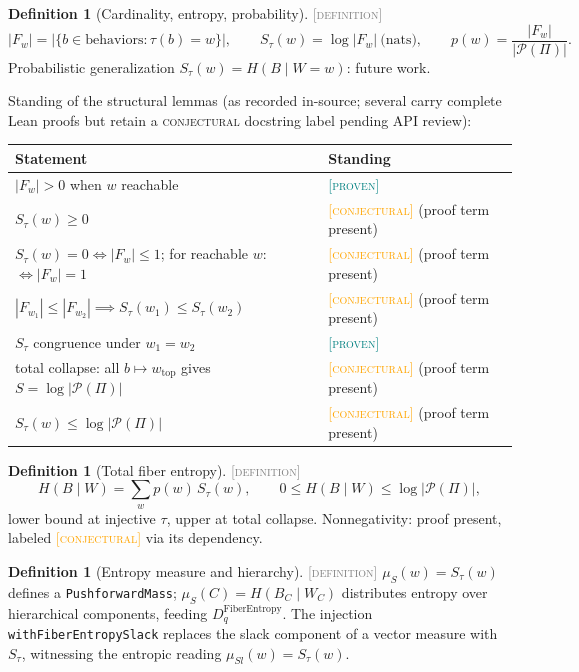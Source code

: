 \documentclass[11pt]{article}
\newcommand{\PROVEN}{\textcolor{teal}{\textsc{[proven]}}}
\newcommand{\DEFINITION}{\textcolor{gray}{\textsc{[definition]}}}
\newcommand{\CONJECTURAL}{\textcolor{orange}{\textsc{[conjectural]}}}
\newcommand{\PT}{\Pi}                          %
\newcommand{\PS}{\mathcal{P}(\PT)}             %
\newcommand{\tmap}{\tau}                       %
\newcommand{\fib}[1]{F_{#1}}                   %
\theoremstyle{plain}
\theoremstyle{definition}
\newtheorem{definition}[theorem]{Definition}
\begin{document}
\begin{definition}[Cardinality, entropy, probability]\DEFINITION\;
\[
  |\fib{w}| = |\{b \in \mathrm{behaviors} : \tmap(b) = w\}|,
  \qquad
  S_\tmap(w) = \log|\fib{w}| \ \text{(nats)},
  \qquad
  p(w) = \frac{|\fib{w}|}{|\PS|}.
\]
Probabilistic generalization $S_\tmap(w) = H(B \mid W = w)$: future work.
\end{definition}

Standing of the structural lemmas (as recorded in-source; several carry
complete Lean proofs but retain a \textsc{conjectural} docstring label
pending API review):
\begin{center}
\begin{tabular}{@{}ll@{}}
\toprule
Statement & Standing \\
\midrule
$|\fib{w}| > 0$ when $w$ reachable & \PROVEN \\
$S_\tmap(w) \ge 0$ & \CONJECTURAL{} (proof term present) \\
$S_\tmap(w) = 0 \iff |\fib{w}| \le 1$; for reachable $w$: $\iff |\fib{w}| = 1$ & \CONJECTURAL{} (proof term present) \\
$|\fib{w_1}| \le |\fib{w_2}| \implies S_\tmap(w_1) \le S_\tmap(w_2)$ & \CONJECTURAL{} (proof term present) \\
$S_\tmap$ congruence under $w_1 = w_2$ & \PROVEN \\
total collapse: all $b \mapsto w_{\mathrm{top}}$ gives $S = \log|\PS|$ & \CONJECTURAL{} (proof term present) \\
$S_\tmap(w) \le \log|\PS|$ & \CONJECTURAL{} (proof term present) \\
\bottomrule
\end{tabular}
\end{center}

\begin{definition}[Total fiber entropy]\DEFINITION\;
\[
  H(B \mid W) = \sum_{w} p(w)\, S_\tmap(w),
  \qquad
  0 \le H(B \mid W) \le \log|\PS| ,
\]
lower bound at injective $\tmap$, upper at total collapse. Nonnegativity:
proof present, labeled \CONJECTURAL{} via its dependency.
\end{definition}

\begin{definition}[Entropy measure and hierarchy]\DEFINITION\;
$\mu_S(w) = S_\tmap(w)$ defines a \texttt{PushforwardMass};
$\mu_S(C) = H(B_C \mid W_C)$ distributes entropy over hierarchical
components, feeding $D_q^{\mathrm{FiberEntropy}}$. The injection
\texttt{withFiberEntropySlack} replaces the slack component of a vector
measure with $S_\tmap$, witnessing the entropic reading
$\mu_{Sl}(w) = S_\tmap(w)$.
\end{definition}
\end{document}
